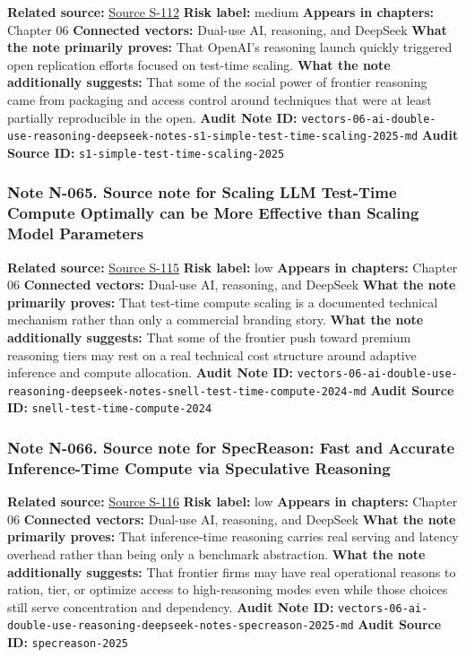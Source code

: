 \documentclass[
  american,
  11pt,
  letterpaper,
]{article}
\begin{document}
\textbf{Related source:}
\hyperref[source-s-112-s1-simple-test-time-scaling]{Source S-112}
\textbf{Risk label:} medium \textbf{Appears in chapters:} Chapter 06
\textbf{Connected vectors:} Dual-use AI, reasoning, and DeepSeek
\textbf{What the note primarily proves:} That OpenAI's reasoning launch
quickly triggered open replication efforts focused on test-time scaling.
\textbf{What the note additionally suggests:} That some of the social
power of frontier reasoning came from packaging and access control
around techniques that were at least partially reproducible in the open.
\textbf{Audit Note ID:}
\texttt{vectors-06-ai-double-use-reasoning-deepseek-notes-s1-simple-test-time-scaling-2025-md}
\textbf{Audit Source ID:} \texttt{s1-simple-test-time-scaling-2025}

\subsubsection{Note N-065. Source note for Scaling LLM Test-Time Compute
Optimally can be More Effective than Scaling Model
Parameters}\label{note-n-065-vectors-06-ai-double-use-reasoning-deepseek-notes-snell-test-time-compute-2024-md}

\textbf{Related source:}
\hyperref[source-s-115-scaling-llm-test-time-compute-optimally-can-be-more-effective-than-scaling-model-parameters]{Source
S-115} \textbf{Risk label:} low \textbf{Appears in chapters:} Chapter 06
\textbf{Connected vectors:} Dual-use AI, reasoning, and DeepSeek
\textbf{What the note primarily proves:} That test-time compute scaling
is a documented technical mechanism rather than only a commercial
branding story. \textbf{What the note additionally suggests:} That some
of the frontier push toward premium reasoning tiers may rest on a real
technical cost structure around adaptive inference and compute
allocation. \textbf{Audit Note ID:}
\texttt{vectors-06-ai-double-use-reasoning-deepseek-notes-snell-test-time-compute-2024-md}
\textbf{Audit Source ID:} \texttt{snell-test-time-compute-2024}

\subsubsection{Note N-066. Source note for SpecReason: Fast and Accurate
Inference-Time Compute via Speculative
Reasoning}\label{note-n-066-vectors-06-ai-double-use-reasoning-deepseek-notes-specreason-2025-md}

\textbf{Related source:}
\hyperref[source-s-116-specreason-fast-and-accurate-inference-time-compute-via-speculative-reasoning]{Source
S-116} \textbf{Risk label:} low \textbf{Appears in chapters:} Chapter 06
\textbf{Connected vectors:} Dual-use AI, reasoning, and DeepSeek
\textbf{What the note primarily proves:} That inference-time reasoning
carries real serving and latency overhead rather than being only a
benchmark abstraction. \textbf{What the note additionally suggests:}
That frontier firms may have real operational reasons to ration, tier,
or optimize access to high-reasoning modes even while those choices
still serve concentration and dependency. \textbf{Audit Note ID:}
\texttt{vectors-06-ai-double-use-reasoning-deepseek-notes-specreason-2025-md}
\textbf{Audit Source ID:} \texttt{specreason-2025}
\end{document}
